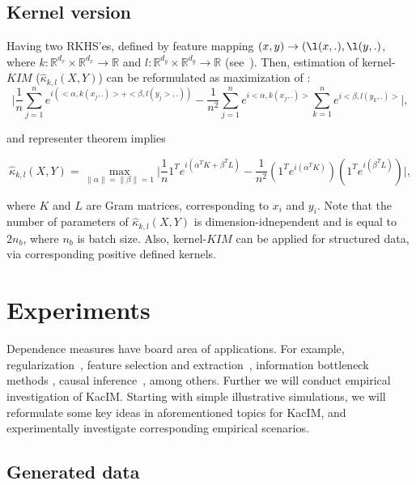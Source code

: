 \documentclass{article}
\begin{document}
{\subsection{Kernel version}

Having two RKHS'es, defined by feature mapping $(x,y) \rightarrow (\l(x,.), \l(y,.)$, where $k: \mathbb{R}^{d_{x}} \times \mathbb{R}^{d_{x}} \rightarrow \mathbb{R}$ and $l: \mathbb{R}^{d_{y}} \times \mathbb{R}^{d_{y}} \rightarrow \mathbb{R}$ (see~\cite{10.5555/3279302}). Then, estimation of kernel-$KIM$ ($\hat{\kappa}_{k,l} (X,Y)$) can be reformulated as maximization of :
\begin{equation}
\label{eq:kernel_estimator}
    \vert \frac{1}{n} \sum_{j=1}^{n} e^{i(<\alpha, k(x_{j},.)> + <\beta, l(y_{j}>,.)) } - \frac{1}{n^2} \sum_{j=1}^{n} e^{i <\alpha, k(x_{j},.)>}\sum_{k=1}^{n} e^{i<\beta, l(y_{k},.)>}\vert,
\end{equation}

and representer theorem\cite{?} implies 

\begin{equation}
\label{eq:kernel_estimator1}
    \hat{\kappa}_{k,l} (X,Y) = \max_{\|\alpha\| = \|\beta\| = 1} \vert \frac{1}{n} 1^{T} e^{i(\alpha^{T} K + \beta^{T} L)} - \frac{1}{n^2} (1^{T} e^{i(\alpha^{T}K)}) (1^{T} e^{i(\beta^{T}L)}) \vert,
\end{equation}

where $K$ and $L$ are Gram matrices, corresponding to $x_{i}$ and $y_{i}$. Note that the number of parameters of $\hat{\kappa}_{k,l} (X,Y)$ is dimension-idnependent and is equal to $2n_{b}$, where $n_{b}$ is batch size. Also, kernel-$KIM$ can be applied for structured data, via corresponding positive defined kernels.

\section{Experiments}
\label{section:experiments}
Dependence measures have board area of applications. For example, regularization~\cite{?,?}, feature selection and extraction~\cite{EigenHSIC}, information bottleneck methods \cite{Ma2020TheHB}, causal inference~\cite{NIPS2008_f7664060}, among others. Further we will conduct empirical investigation of KacIM. Starting with simple illustrative simulations, we will reformulate some key ideas in aforementioned topics for KacIM, and experimentally investigate corresponding empirical scenarios.


\subsection{Generated data}

}
\end{document}

